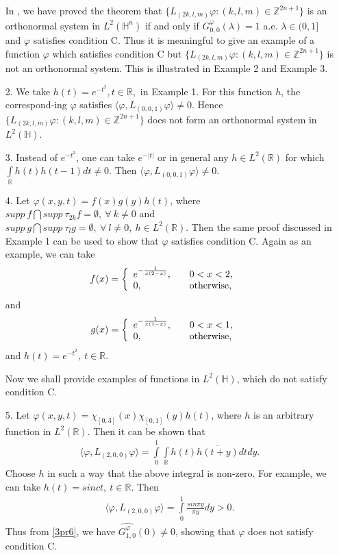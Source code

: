 \documentclass[a4paper,12pt,reqno]{amsart}
\theoremstyle{plain}
\numberwithin{equation}{section}
\theoremstyle{definition}
\newcounter {own}
\begin{document}
\begin{itemize}
In \cite{ra}, we have proved the theorem that $\{L_{(2k,l,m)}\varphi:(k,l,m)\in\mathbb{Z}^{2n+1}\}$ is an orthonormal system in $L^{2}(\mathbb{H}^{n})$ if and only if $G_{0,0}^{\varphi}(\lambda)=1$ a.e. $\lambda\in (0,1]$ and $\varphi$ satisfies condition C. Thus it is meaningful to give an example of a function $\varphi$ which satisfies condition C but $\{L_{(2k,l,m)}\varphi:(k,l,m)\in\mathbb{Z}^{2n+1}\}$ is not an orthonormal system. This is illustrated in Example 2 and Example 3.
\item [2.] We take $h(t)=e^{-t^{2}}, t\in\mathbb{R},$ in Example 1. For this function $h$, the correspond-ing $\varphi$ satisfies $\langle\varphi, L_{(0,0,1)}\varphi\rangle\neq 0$.
Hence $\{L_{(2k,l,m)}\varphi:(k,l,m)\in\mathbb{Z}^{2n+1}\}$ does not form an orthonormal system in $L^{2}(\mathbb{H})$.
\item [3.] Instead of $e^{-t^{2}}$, one can take $e^{-|t|}$ or in general any $h\in L^{2}(\mathbb{R})$ for which $\int\limits_{\mathbb{R}}h(t)h(t-1)dt\neq 0$. Then $\langle\varphi, L_{(0,0,1)}\varphi\rangle\neq 0$.
\item [4.] Let $\varphi(x,y,t)=f(x)g(y)h(t)$, where $supp~f\bigcap supp~\tau_{2k}f=\emptyset,~\forall~k\neq 0$ and $supp~g\bigcap supp~\tau_{l}g=\emptyset,~\forall~l\neq 0,~h\in L^{2}(\mathbb{R})$. Then the same proof discussed in Example 1 can be used to show that $\varphi$ satisfies condition C. Again as an example, we can take
\begin{eqnarray*}
f(x)&=\left\{
\begin{array}{l l}
e^{-\frac{1}{x(2-x)}},& \quad \text{$0<x<2$,}\\
0, & \quad \text{otherwise,}
\end{array}\right.
\end{eqnarray*}
and
\begin{eqnarray*}
g(x)&=\left\{
\begin{array}{l l}
e^{-\frac{1}{x(1-x)}},& \quad \text{$0<x<1$,}\\
0, & \quad \text{otherwise,}
\end{array}\right.
\end{eqnarray*}
and $h(t)=e^{-t^{2}},~t\in\mathbb{R}$.

Now we shall provide examples of functions in $L^{2}(\mathbb{H})$, which do not satisfy condition C.
\item [5.]Let $\varphi(x,y,t)=\chi_{[0,3]}(x)\chi_{[0,1]}(y)h(t)$, where $h$ is an arbitrary function in $L^{2}(\mathbb{R})$. Then it can be shown that 
\begin{eqnarray*}
\langle\varphi, L_{(2,0,0)}\varphi\rangle
=\int\limits_{0}^{1}\int\limits_{\mathbb{R}} h(t)\overline{h(t+y)}dtdy.
\end{eqnarray*}
Choose $h$ in such a way that the above integral is non-zero. For example, we can take $h(t)=sinct,~t\in\mathbb{R}$. Then
\begin{eqnarray*}
\langle\varphi, L_{(2,0,0)}\varphi\rangle
=\int\limits_{0}^{1}\frac{sin\pi y}{\pi y}dy
>0.
\end{eqnarray*}
Thus from \eqref{3pr6}, we have $\widehat{G_{1,0}^{\varphi}}(0)\neq 0$, showing that $\varphi$ does not satisfy condition C. 


\end{itemize}
\end{document}
